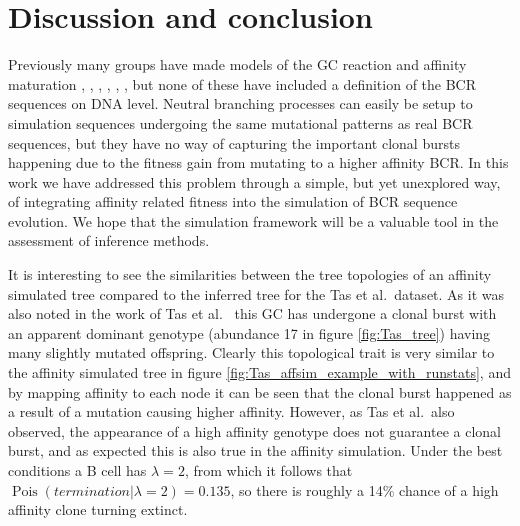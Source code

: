 \section{Discussion and conclusion}
Previously many groups have made models of the GC reaction and affinity maturation \cite{Reshetova_2017}, \cite{Shahaf_2008}, \cite{Chaudhury_2014}, \cite{Wang_Mata_2015}, \cite{Childs_Baskerville_Cobey_2015}, \cite{robert2017simulate}, but none of these have included a definition of the BCR sequences on DNA level.
Neutral branching processes can easily be setup to simulation sequences undergoing the same mutational patterns as real BCR sequences, but they have no way of capturing the important clonal bursts happening due to the fitness gain from mutating to a higher affinity BCR.
In this work we have addressed this problem through a simple, but yet unexplored way, of integrating affinity related fitness into the simulation of BCR sequence evolution.
We hope that the simulation framework will be a valuable tool in the assessment of inference methods.

It is interesting to see the similarities between the tree topologies of an affinity simulated tree compared to the inferred tree for the Tas et al.\ dataset.
As it was also noted in the work of Tas et al.\ \cite{tas2016visualizing} this GC has undergone a clonal burst with an apparent dominant genotype (abundance 17 in figure \ref{fig:Tas_tree}) having many slightly mutated offspring.
Clearly this topological trait is very similar to the affinity simulated tree in figure \ref{fig:Tas_affsim_example_with_runstats}, and by mapping affinity to each node it can be seen that the clonal burst happened as a result of a mutation causing higher affinity.
However, as Tas et al.\ also observed, the appearance of a high affinity genotype does not guarantee a clonal burst, and as expected this is also true in the affinity simulation.
Under the best conditions a B cell has $\lambda=2$, from which it follows that $\operatorname{Pois}(termination | \lambda=2) = 0.135$, so there is roughly a 14\% chance of a high affinity clone turning extinct.


